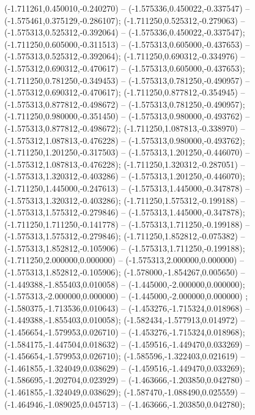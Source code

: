  (-1.711261,0.450010,-0.240270) -- (-1.575336,0.450022,-0.337547) -- (-1.575461,0.375129,-0.286107);
 (-1.711250,0.525312,-0.279063) -- (-1.575313,0.525312,-0.392064) -- (-1.575336,0.450022,-0.337547);
 (-1.711250,0.605000,-0.311513) -- (-1.575313,0.605000,-0.437653) -- (-1.575313,0.525312,-0.392064);
 (-1.711250,0.690312,-0.334976) -- (-1.575312,0.690312,-0.470617) -- (-1.575313,0.605000,-0.437653);
 (-1.711250,0.781250,-0.349453) -- (-1.575313,0.781250,-0.490957) -- (-1.575312,0.690312,-0.470617);
 (-1.711250,0.877812,-0.354945) -- (-1.575313,0.877812,-0.498672) -- (-1.575313,0.781250,-0.490957);
 (-1.711250,0.980000,-0.351450) -- (-1.575313,0.980000,-0.493762) -- (-1.575313,0.877812,-0.498672);
 (-1.711250,1.087813,-0.338970) -- (-1.575312,1.087813,-0.476228) -- (-1.575313,0.980000,-0.493762);
 (-1.711250,1.201250,-0.317503) -- (-1.575313,1.201250,-0.446070) -- (-1.575312,1.087813,-0.476228);
 (-1.711250,1.320312,-0.287051) -- (-1.575313,1.320312,-0.403286) -- (-1.575313,1.201250,-0.446070);
 (-1.711250,1.445000,-0.247613) -- (-1.575313,1.445000,-0.347878) -- (-1.575313,1.320312,-0.403286);
 (-1.711250,1.575312,-0.199188) -- (-1.575313,1.575312,-0.279846) -- (-1.575313,1.445000,-0.347878);
 (-1.711250,1.711250,-0.141778) -- (-1.575313,1.711250,-0.199188) -- (-1.575313,1.575312,-0.279846);
 (-1.711250,1.852812,-0.075382) -- (-1.575313,1.852812,-0.105906) -- (-1.575313,1.711250,-0.199188);
 (-1.711250,2.000000,0.000000) -- (-1.575313,2.000000,0.000000) -- (-1.575313,1.852812,-0.105906);
 (-1.578000,-1.854267,0.005650) -- (-1.449388,-1.855403,0.010058) -- (-1.445000,-2.000000,0.000000);
 (-1.575313,-2.000000,0.000000) -- (-1.445000,-2.000000,0.000000) ;
 (-1.580375,-1.713536,0.010643) -- (-1.453276,-1.715324,0.018968) -- (-1.449388,-1.855403,0.010058);
 (-1.582434,-1.577913,0.014972) -- (-1.456654,-1.579953,0.026710) -- (-1.453276,-1.715324,0.018968);
 (-1.584175,-1.447504,0.018632) -- (-1.459516,-1.449470,0.033269) -- (-1.456654,-1.579953,0.026710);
 (-1.585596,-1.322403,0.021619) -- (-1.461855,-1.324049,0.038629) -- (-1.459516,-1.449470,0.033269);
 (-1.586695,-1.202704,0.023929) -- (-1.463666,-1.203850,0.042780) -- (-1.461855,-1.324049,0.038629);
 (-1.587470,-1.088490,0.025559) -- (-1.464946,-1.089025,0.045713) -- (-1.463666,-1.203850,0.042780);

